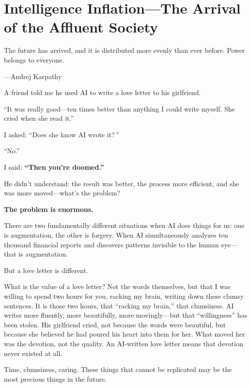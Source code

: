 \chapter{Intelligence Inflation---The Arrival of the Affluent Society}


\begin{myquote}
The future has arrived, and it is distributed more evenly than ever before. Power belongs to everyone.

\hfill ---Andrej Karpathy
\end{myquote}

{\kaiti
A friend told me he used AI to write a love letter to his girlfriend.

``It was really good---ten times better than anything I could write myself. She cried when she read it.''

I asked: ``Does she know AI wrote it?\,''

``No.''

I said: \textbf{``Then you're doomed.''}
}
\vspace{1em}

He didn't understand: the result was better, the process more efficient, and she was more moved---what's the problem?

\textbf{The problem is enormous.}

There are two fundamentally different situations when AI does things for us: one is augmentation, the other is forgery. When AI simultaneously analyzes ten thousand financial reports and discovers patterns invisible to the human eye---that is augmentation.

\vspace{1em}

But a love letter is different.

What is the value of a love letter? Not the words themselves, but that I was willing to spend two hours for you, racking my brain, writing down these clumsy sentences. It is those two hours, that ``racking my brain,'' that clumsiness.
AI writes more fluently, more beautifully, more movingly---but that ``willingness'' has been stolen.
His girlfriend cried, not because the words were beautiful, but because she believed he had poured his heart into them for her.
What moved her was the devotion, not the quality. An AI-written love letter means that devotion never existed at all.

\vspace{1em}

Time, clumsiness, caring.
These things that cannot be replicated may be the most precious things in the future.

